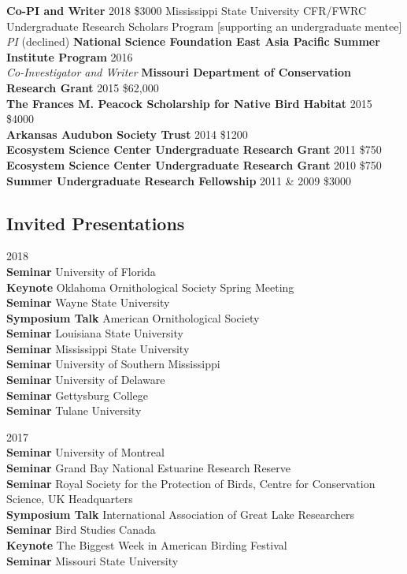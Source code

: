 \documentclass[]{article}
\begin{document}
\textbf{Co-PI and Writer} 2018 \$3000 Mississippi State University
CFR/FWRC Undergraduate Research Scholars Program {[}supporting an
undergraduate mentee{]}\\
\emph{PI} (declined) \textbf{National Science Foundation East Asia
Pacific Summer Institute Program} 2016\\
\emph{Co-Investigator and Writer} \textbf{Missouri Department of
Conservation Research Grant} 2015 \$62,000\\
\textbf{The Frances M. Peacock Scholarship for Native Bird Habitat} 2015
\$4000\\
\textbf{Arkansas Audubon Society Trust} 2014 \$1200\\
\textbf{Ecosystem Science Center Undergraduate Research Grant} 2011
\$750\\
\textbf{Ecosystem Science Center Undergraduate Research Grant} 2010
\$750\\
\textbf{Summer Undergraduate Research Fellowship} 2011 \& 2009 \$3000

\subsection{Invited Presentations}\label{invited-presentations}

2018\\
\textbf{Seminar} University of Florida\\
\textbf{Keynote} Oklahoma Ornithological Society Spring Meeting\\
\textbf{Seminar} Wayne State University\\
\textbf{Symposium Talk} American Ornithological Society\\
\textbf{Seminar} Louisiana State University\\
\textbf{Seminar} Mississippi State University\\
\textbf{Seminar} University of Southern Mississippi\\
\textbf{Seminar} University of Delaware\\
\textbf{Seminar} Gettysburg College\\
\textbf{Seminar} Tulane University

2017\\
\textbf{Seminar} University of Montreal\\
\textbf{Seminar} Grand Bay National Estuarine Research Reserve\\
\textbf{Seminar} Royal Society for the Protection of Birds, Centre for
Conservation Science, UK Headquarters\\
\textbf{Symposium Talk} International Association of Great Lake
Researchers\\
\textbf{Seminar} Bird Studies Canada\\
\textbf{Keynote} The Biggest Week in American Birding Festival\\
\textbf{Seminar} Missouri State University
\end{document}
